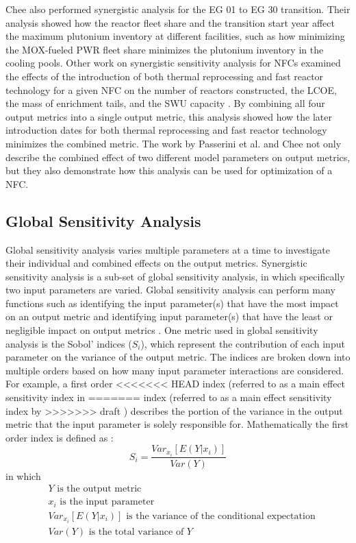 Chee \cite{chee_sensitivity_2019} also performed synergistic analysis for 
the \gls{EG} 01 to \gls{EG} 30 transition. 
Their analysis showed how the reactor fleet share and the transition start 
year affect the maximum plutonium inventory at different facilities, such as 
how minimizing the \gls{MOX}-fueled \gls{PWR} fleet share minimizes the 
plutonium inventory in the cooling pools. 
Other work on synergistic sensitivity analysis for \glspl{NFC} examined the 
effects of the introduction of both thermal reprocessing and fast reactor 
technology for a given \gls{NFC} on the number of reactors constructed, 
the \gls{LCOE}, the mass of enrichment tails, and the \gls{SWU} 
capacity \cite{passerini_systematic_2014}. By combining all four output 
metrics into a single output metric, this analysis showed how the 
later introduction dates for both thermal reprocessing 
and fast reactor technology minimizes the combined metric. The work by 
Passerini 
et al. \cite{passerini_systematic_2014} and Chee \cite{chee_sensitivity_2019}
not only describe the combined effect of two different model parameters on 
output metrics, but they also demonstrate how this analysis can be used for 
optimization of a \gls{NFC}. 

\subsection{Global Sensitivity Analysis}\label{sec:global_background}
Global sensitivity analysis varies multiple parameters at a time to 
investigate their individual and combined effects on the output metrics. 
Synergistic sensitivity analysis is a sub-set of global sensitivity 
analysis, in which specifically two input parameters are varied.
Global sensitivity analysis can perform many functions such as identifying 
the input 
parameter(s) that have the most impact on an output metric and identifying 
input parameter(s) that have the least or negligible impact on output 
metrics \cite{thiolliere_methodology_2018}. One metric used 
in global sensitivity analysis is the Sobol' indices ($S_{i}$), which 
represent the 
contribution of each input parameter on the variance of the output metric.
The indices are broken down into multiple orders based on how many 
input parameter interactions are considered. For example, a first order 
<<<<<<< HEAD
index (referred to as a main effect sensitivity index in 
=======
index (referred to as a main effect sensitivity index by 
>>>>>>> draft
\cite{adams_dakota_2021}) describes the 
portion of the variance in the output metric that the input parameter is 
solely 
responsible for. Mathematically the first order index is defined as  
\cite{adams_dakota_2021}:
\begin{equation}
    S_i = \frac{Var_{x_i}[E(Y|x_i)]}{Var(Y)}
\end{equation}
in which 
\begin{align*}
    &Y \text{ is the output metric} \\
    &x_i \text { is the input parameter}\\
    &Var_{x_i}[E(Y|x_i)] \text{ is the variance of the conditional expectation}\\
    &Var(Y) \text{ is the total variance of } Y
\end{align*}

